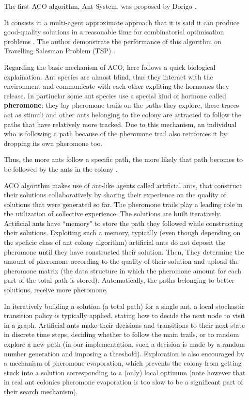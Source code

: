 The first ACO algorithm, Ant System, was proposed by Dorigo \cite{cinque, sei, sette, otto, nove}.

It consists in a multi-agent approximate approach that it is said it can produce good-quality solutions in a reasonable time for combinatorial optimisation problems \cite{cinque}. 
The author demonstrate the performance of this algorithm on Travelling Salesman  Problem  (TSP) \cite{sei}. 

Regarding the basic mechanism of ACO, here follows a quick biological explaination.
Ant species are almost blind, thus they interact with the environment and communicate with each  other  expliting the hormones  they  release.  
In partiuclar some  ant  species use a special kind of hormone called \textbf{pheromone}: they lay pheromone trails on the paths they explore, these traces act as stimuli and other ants belonging to the colony are attracted to follow  the  paths  that  have  relatively  more  tracked.  
Due to this mechanism, an individual who is following a  path  because of the  pheromone  trail  also reinforces  it  by  dropping its  own pheromone  too.  

Thus, the  more ants  follow  a  specific  path,  the  more  likely  that  path  becomes  to  be  followed  by  the  ants  in the colony \cite{ cinque,otto, nove}.  

ACO  algorithm  makes use  of ant-like  agents  called artificial ants, that construct their   solutions   collaboratively   by   sharing   their experience on the quality of solutions that were generated so far.
The pheromone trails play  a  leading  role  in  the  utilization  of collective experience.
The solutions are built iteratively.
Artificial  ants  have  ``memory"  to  store  the  path  they  followed  while  constructing  their solutions.  Exploiting such a memory,  typically (even though depending on the speficic class of ant colony algorithm) artificial  ants  do not deposit  the pheromone until they have constructed their solution. Then, They determine the amount of pheromone according  to  the  quality  of  their  solution  and upload the pheromone matrix (the data structure in which the pheromone amount for each part of the total path is stored). 
Automatically, the  paths  belonging  to  better  solutions,  receive  more pheromone.

In iteratively building a solution (a total path) for a single ant, a  local  stochastic  transition  policy  is typically applied, stating how to decide the next node to visit in a graph. Artificial  ants  make  their  decisions  and  transitions  to  their  next  state  in  discrete  time steps, deciding whether to follow the main trails, or to random explore a new path (in our implementation, such a decision is made by a random number generation and imposing a threshold).
Exploration  is  also encouraged  by  a mechanism of  pheromone  evaporation, which prevents the  colony from  getting  stuck  into a solution  corresponding to a (only) local optimum (note however that in  real  ant  colonies  pheromone evaporation is too slow to be a significant part of their search mechanism).


